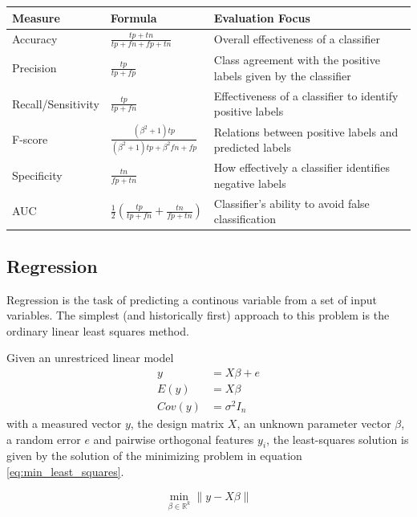 \begin{center}
    \begin{tabularx}{\textwidth}{|l|l|X|}
    \hline
    Measure & Formula & Evaluation Focus \\ \hline
    Accuracy & $\frac{tp+tn}{tp+fn+fp+tn}$ & Overall effectiveness of a classifier \\ \hline
    Precision & $\frac{tp}{tp+fp}$ & Class agreement with the positive labels given by the classifier \\
    \hline
    Recall/Sensitivity & $\frac{tp}{tp+fn}$ & Effectiveness of a classifier to identify positive labels \\
    \hline
    F-score & $\frac{(\beta^2+1)tp}{(\beta^2+1)tp+\beta^2fn+fp}$ & Relations between positive labels and predicted labels\\
    \hline
    Specificity & $\frac{tn}{fp+tn}$ & How effectively a classifier identifies negative labels \\ \hline
    AUC & $\frac{1}{2}(\frac{tp}{tp+fn}+\frac{tn}{fp+tn})$ & Classifier’s ability to avoid false classification \\ \hline
    \end{tabularx}
\end{center}

\subsection{Regression}
Regression is the task of predicting a continous variable
from a set of input variables.
The simplest (and historically first) approach 
to this problem is the ordinary linear least squares method.

Given an unrestriced linear model
\begin{align}
	y &= X\beta + e \\
	E(y) &= X\beta \\
	Cov(y) &= \sigma^2 I_n
\end{align}
with a measured vector $y$, the design matrix $X$,
an unknown parameter vector $\beta$, a random error $e$ 
and pairwise orthogonal features $y_i$,
the least-squares solution is given by the solution of 
the minimizing problem in equation \ref{eq:min_least_squares}.

\begin{equation}
	\min_{\beta\in\mathbb{R}^k} \lVert y - X\beta \rVert
	\label{eq:min_least_squares}
\end{equation}

